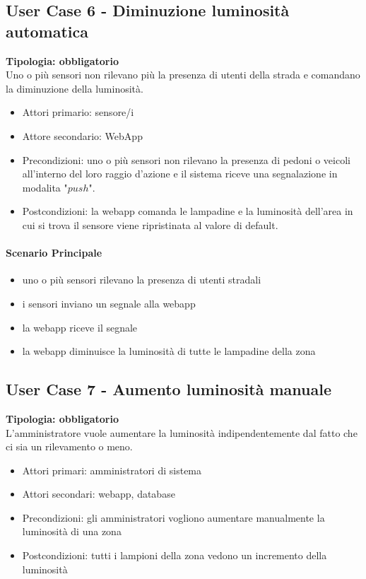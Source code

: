 \documentclass[12pt]{article}
\begin{document}
\subsection{User Case 6 - Diminuzione luminosità automatica}
\textbf{Tipologia: obbligatorio}\\
Uno o più sensori non rilevano più la presenza di utenti della strada e comandano la diminuzione della luminosità.
\begin{itemize}
	\item Attori primario: sensore/i
	\item Attore secondario: WebApp
	\item Precondizioni: uno o più sensori non rilevano la presenza di pedoni o veicoli all'interno del loro raggio d'azione e il sistema riceve una segnalazione in modalita "$push$".
	\item Postcondizioni: la webapp comanda le lampadine e la luminosità dell'area in cui si trova il sensore viene ripristinata al valore di default.
\end{itemize}
\paragraph{Scenario Principale}
\begin{itemize}
	\item uno o più sensori rilevano la presenza di utenti stradali
	\item i sensori inviano un segnale alla webapp
	\item la webapp riceve il segnale
	\item la webapp diminuisce la luminosità di tutte le lampadine della zona
\end{itemize}

\subsection{User Case 7 - Aumento luminosità manuale}
\textbf{Tipologia: obbligatorio} \\
L'amministratore vuole aumentare la luminosità indipendentemente dal fatto che ci sia un rilevamento o meno.
\begin{itemize}
	\item Attori primari: amministratori di sistema
	\item Attori secondari: webapp, database
	\item Precondizioni: gli amministratori vogliono aumentare manualmente la luminosità di una zona
	\item Postcondizioni: tutti i lampioni della zona vedono un incremento della luminosità
\end{itemize}
\end{document}
